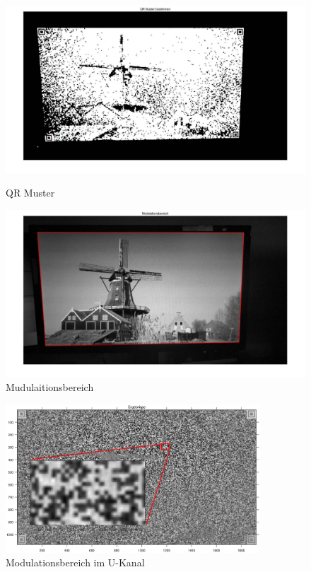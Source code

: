 \begin{figure}[H]
\centering 
\begin{minipage}[b]{0.49\textwidth} 
\centering 
\includegraphics[width=1.0\textwidth]{images/5_Implementirung/QR_muster.pdf} 
\caption{QR Muster}
\label{fig:QR_muster}
\end{minipage}
\begin{minipage}[b]{0.49\textwidth} 
\centering 
\includegraphics[width=1.0\textwidth]{images/5_Implementirung/Mudulaition.pdf}
\caption{Mudulaitionsbereich}
\label{fig:Mudulaitionbereich}
\end{minipage}
\end{figure}

\begin{figure}[H]
 \centering 
  \includegraphics[keepaspectratio,width=0.85\textwidth]{images/5_Implementirung/diffq8.eps}
 \caption{Modulationsbereich im U-Kanal}
 \label{fig:Ergebnis1}
\end{figure}

